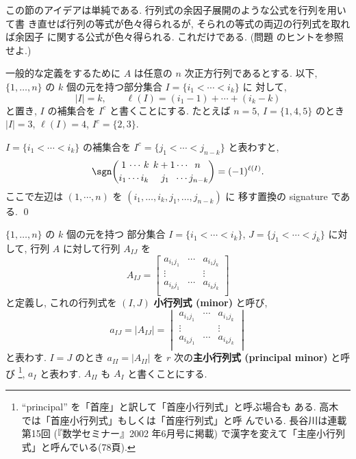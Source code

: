 \documentclass[12pt,twoside]{jarticle}
\begin{document}
この節のアイデアは単純である. 行列式の余因子展開のような公式を行列を用いて書
き直せば行列の等式が色々得られるが, そられの等式の両辺の行列式を取れば余因子
に関する公式が色々得られる. これだけである.  
(問題  のヒントを参照せよ.)

一般的な定義をするために $A$ は任意の $n$ 次正方行列であるとする.
以下, $\{1,\dots,n\}$ の $k$ 個の元を持つ部分集合 $I=\{i_1<\cdots<i_k\}$ に
対して, 
\begin{equation*}
  |I|=k, \qquad \ell(I)=(i_1-1)+\cdots+(i_k-k)
\end{equation*}
と置き, $I$ の補集合を $I^c$ と書くことにする.  
たとえば $n=5$, $I=\{1,4,5\}$ のとき $|I|=3$, $\ell(I)=4$, $I^c=\{2,3\}$. 

\begin{question}
  $I=\{i_1<\cdots<i_k\}$ の補集合を $I^c=\{j_1<\cdots<j_{n-k}\}$ と表わすと,
  \begin{equation*}
    \sgn\binom
    { 1\, \cdots \,k\;\,         k+1     \cdots \;\; n\;\;}
    { i_1  \cdots i_k\,   \;\;\;\;j_1\;\; \cdots  j_{n-k}  }
    = (-1)^{\ell(I)}.
  \end{equation*}
  ここで左辺は $(1,\cdots,n)$ を $(i_1,\dots,i_k,j_1,\dots,j_{n-k})$ に
  移す置換の signature である. \qed
\end{question}


$\{1,\dots,n\}$ の $k$ 個の元を持つ
部分集合 $I=\{i_1<\cdots<i_k\}$, $J=\{j_1<\cdots<j_k\}$ に対して,
行列 $A$ に対して行列 $A_{IJ}$ を
\begin{equation*}
  A_{IJ} =
  \begin{bmatrix}
    a_{i_1j_1} & \cdots & a_{i_1j_k} \\
      \vdots   &        &   \vdots   \\
    a_{i_kj_1} & \cdots & a_{i_kj_k} \\
  \end{bmatrix}
\end{equation*}
と定義し, これの行列式を $(I,J)$ {\bf 小行列式 (minor)} と呼び,
\begin{equation*}
  a_{IJ} = |A_{IJ}| =
  \begin{vmatrix}
    a_{i_1j_1} & \cdots & a_{i_1j_k} \\
      \vdots   &        &   \vdots   \\
    a_{i_kj_1} & \cdots & a_{i_kj_k} \\
  \end{vmatrix}
\end{equation*}
と表わす.  $I=J$ のとき $a_{II}=|A_{II}|$ 
を $r$ 次の{\bf 主小行列式 (principal minor)} と呼び%
\footnote{``principal'' を「首座」と訳して「首座小行列式」と呼ぶ場合も
  ある.  高木 \cite{takagi1} では「首座小行列式」もしくは「首座行列式」と呼
  んでいる. 長谷川は連載 \cite{hasegawa-rensai} 第15回 (『数学セミナー』2002
  年6月号に掲載) で漢字を変えて「主座小行列式」と呼んでいる(78頁).}, 
$a_I$ と表わす.
$A_{II}$ も $A_I$ と書くことにする.
\end{document}
